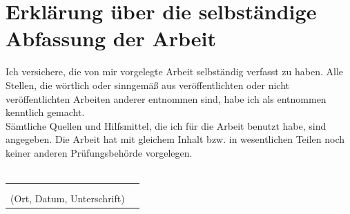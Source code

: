 \documentclass[a4paper,12pt,oneside]{article}
\begin{document}
  \section*{Erklärung über die selbständige\\Abfassung der Arbeit}
    Ich versichere, die von mir vorgelegte Arbeit selbständig verfasst zu haben.
    Alle Stellen, die wörtlich oder sinngemäß aus veröffentlichten oder nicht veröffentlichten Arbeiten anderer entnommen sind,
    habe ich als entnommen kenntlich gemacht.\\ 
    Sämtliche Quellen und Hilfsmittel, die ich für die Arbeit benutzt habe, sind
    angegeben. Die Arbeit hat mit gleichem Inhalt bzw. in wesentlichen Teilen noch keiner anderen Prüfungsbehörde vorgelegen.\\\\
    \begin{tabular}{cp{7cm}}
      & \\ 
      & \\ \hline
      \small (Ort, Datum, Unterschrift) & \normalsize \\
    \end{tabular}
  
  \newpage

  \thispagestyle{empty}
  
\end{document}
